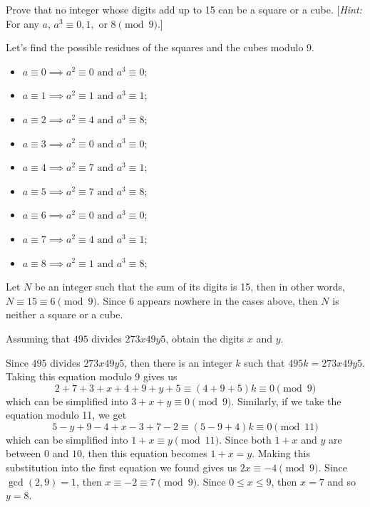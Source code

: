 \begin{exercise}
    Prove that no integer whose digits add up to 15 can be a square or a cube. [\textit{Hint:} For any $a$, $a^3 \equiv 0, 1,$ or $8 \pmod 9$.] \\
\end{exercise}

\begin{solution}
    Let's find the possible residues of the squares and the cubes modulo 9.
    \begin{itemize}
        \item $a \equiv 0 \implies a^2 \equiv 0 \text{ and } a^3 \equiv 0$;
        \item $a \equiv 1 \implies a^2 \equiv 1 \text{ and } a^3 \equiv 1$;
        \item $a \equiv 2 \implies a^2 \equiv 4 \text{ and } a^3 \equiv 8$;
        \item $a \equiv 3 \implies a^2 \equiv 0 \text{ and } a^3 \equiv 0$;
        \item $a \equiv 4 \implies a^2 \equiv 7 \text{ and } a^3 \equiv 1$;
        \item $a \equiv 5 \implies a^2 \equiv 7 \text{ and } a^3 \equiv 8$;
        \item $a \equiv 6 \implies a^2 \equiv 0 \text{ and } a^3 \equiv 0$;
        \item $a \equiv 7 \implies a^2 \equiv 4 \text{ and } a^3 \equiv 1$;
        \item $a \equiv 8 \implies a^2 \equiv 1 \text{ and } a^3 \equiv 8$;
    \end{itemize}
    Let $N$ be an integer such that the sum of its digits is 15, then in other words, $N \equiv 15 \equiv 6 \pmod 9$. Since 6 appears nowhere in the cases above, then $N$ is neither a square or a cube. \\
\end{solution}

\begin{exercise}
    Assuming that $495$ divides $273x49y5$, obtain the digits $x$ and $y$. \\
\end{exercise}

\begin{solution}
    Since $495$ divides $273x49y5$, then there is an integer $k$ such that $495k = 273x49y5$. Taking this equation modulo 9 gives us
    $$2 + 7 + 3 + x + 4 + 9 + y + 5 \equiv (4 + 9 + 5)k \equiv 0 \pmod 9$$
    which can be simplified into $3 + x + y \equiv 0 \pmod 9$. Similarly, if we take the equation modulo 11, we get 
    $$5 - y + 9 - 4 + x - 3 + 7 - 2 \equiv (5 - 9 + 4)k \equiv 0 \pmod{11}$$
    which can be simplified into $1 + x \equiv y \pmod{11}$. Since both $1 + x$ and $y$ are between 0 and $10$, then this equation becomes $1 + x = y$. Making this substitution into the first equation we found gives us $2x \equiv - 4 \pmod 9$. Since $\gcd(2, 9) = 1$, then $x \equiv -2 \equiv 7 \pmod 9$. Since $0 \leq x \leq 9$, then $x = 7$ and so $y = 8$. \\
\end{solution}

